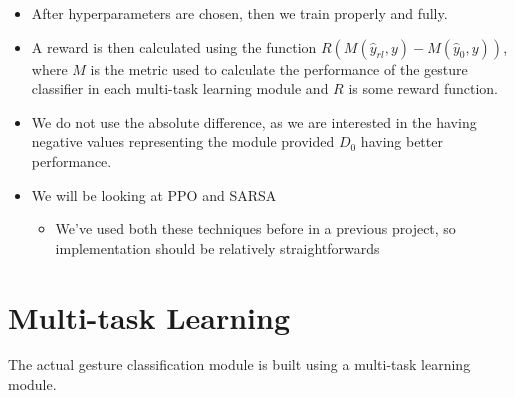 \begin{itemize}
	\item After hyperparameters are chosen, then we train properly and fully.
	\item A reward is then calculated using the function $R\left(M\left(\hat{y}_{rl}, y\right)-M\left(\hat{y}_{0}, y\right)\right)$, where $M$ is the metric used to calculate the performance of the gesture classifier in each multi-task learning module and $R$ is some reward function.
	\item We do not use the absolute difference, as we are interested in the having negative values representing the module provided $D_0$ having better performance.
	\item We will be looking at PPO \cite{schulman2017proximal} and SARSA \cite{rummery1994line}
	\begin{itemize}
		\item We've used both these techniques before in a previous project, so implementation should be relatively straightforwards
	\end{itemize}
\end{itemize}

\section{Multi-task Learning}\label{sec:methodology-multi-task-learning}

The actual gesture classification module is built using a multi-task learning module.


